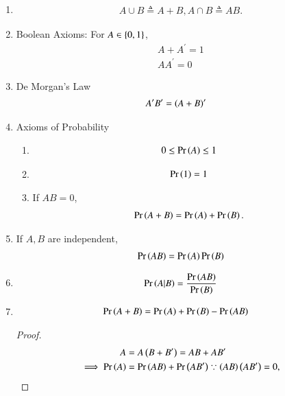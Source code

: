\begin{enumerate}[label=\thesubsection.\arabic*,ref=\thesubsection.\theenumi]
	\item
\begin{align}
	A \cup B \triangleq A+B, A \cap B \triangleq AB.
\end{align}
	\item  Boolean Axioms:  For $A \in \left\{0,1\right\}$,
\begin{align}
	A + A^{\prime} = 1
	\\
	A  A^{\prime} = 0
\end{align}
\item De Morgan's Law
\begin{align}
A^{\prime}B^{\prime} &=  \brak{A+B}^{\prime}
	\label{eq:demorgan}
\end{align}
\item Axioms of Probability
	\begin{enumerate}
\item 
\begin{align}
	0 \le \pr{A} \le 1	
	\label{eq:axiom-pos}
\end{align}
\item 
\begin{align}
	\pr{1} =1	
	\label{eq:axiom-one}
\end{align}
\item If $AB = 0$,
\begin{align}
	\pr{A+B} = \pr{A} + \pr{B}.
\label{eq:axiom_exclusive}
\end{align}
	\end{enumerate}
\item If $A, B$ are independent,
\begin{align}
	\Pr\left(AB\right) = \Pr\left(A\right)\Pr\left(B\right)
\end{align}
\item 
\begin{align}
	\Pr\left(A | B\right) = \frac{\Pr\left(AB\right)}{\Pr\left(B\right)}
\end{align}
\item 
	\begin{align}
\pr{A+B} &= \pr{A} + \pr{B} - \pr{AB} 
\label{eq:axiom_sum_AB}
\end{align}
		\begin{proof}
\begin{align}
	A &= A \brak{B+B^{\prime}} =  AB + AB^{\prime}
\\
	\implies \pr{A} &=  \pr{AB} + \pr{AB^{\prime}}
	\because
	\brak{ AB}\brak{  AB^{\prime}} = 0,
\label{eq:axiom_sum_A}

\end{align}
\end{proof}
\end{enumerate}

